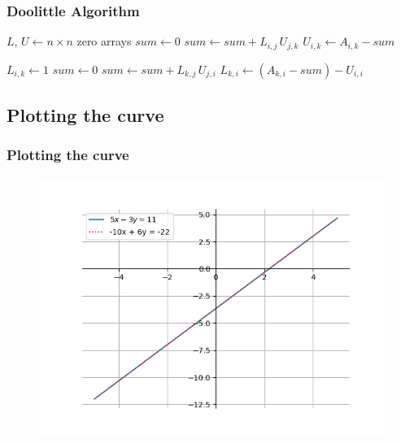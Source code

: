 \documentclass{beamer}
\theoremstyle{remark}
\numberwithin{equation}{section}
\begin{document}
\begin{frame}[allowframebreaks]
    \frametitle{Doolittle Algorithm}
        \begin{algorithmic}
            \STATE $L$, $U  \gets n\times n$ zero arrays
                    \STATE $sum \gets 0$
                        \STATE $sum \gets sum + L_{i,j} \, U_{j,k}$
                    \ENDFOR
                    \STATE $U_{i,k} \gets A_{i,k} - sum$
                \ENDFOR

                        \STATE $L_{i,k} \gets 1$
                    \ELSE
                        \STATE $sum \gets 0$
                            \STATE $sum \gets sum+L_{k,j}\,U_{j,i}$
                        \ENDFOR
                        \STATE $L_{k,i} \gets (A_{k,i} - sum) - U_{i,i}$
                    \ENDIF
                \ENDFOR
            \ENDFOR

        \end{algorithmic}
\end{frame}

\subsection{Plotting the curve}
\begin{frame}
\frametitle{Plotting the curve}
\begin{figure}[h]
    \includegraphics[scale=0.59]{../figs/fig1.png}
\centering
\end{figure}
\end{frame}
\end{document}
